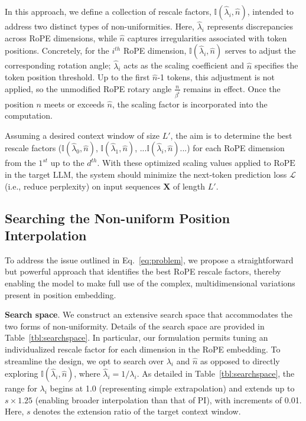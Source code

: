 In this approach, we define a collection of rescale factors, $\mathbb{I}(\hat{\lambda}_{i},\hat{n})$, intended to address two distinct types of non-uniformities. Here, $\hat{\lambda}_i$ represents discrepancies across RoPE dimensions, while $\hat{n}$ captures irregularities associated with token positions. Concretely, for the $i^{th}$ RoPE dimension, $\mathbb{I}(\hat{\lambda}_{i},\hat{n})$ serves to adjust the corresponding rotation angle; $\hat{\lambda}_{i}$ acts as the scaling coefficient and $\hat{n}$ specifies the token position threshold. Up to the first $\hat{n}$-1 tokens, this adjustment is not applied, so the unmodified RoPE rotary angle $\frac{n}{\beta^i}$ remains in effect. Once the position $n$ meets or exceeds $\hat{n}$, the scaling factor is incorporated into the computation.

Assuming a desired context window of size $L'$, the aim is to determine the best rescale factors ($\mathbb{I}(\hat{\lambda}_{0},\hat{n})$, $\mathbb{I}(\hat{\lambda}_{1},\hat{n})$, ...$\mathbb{I}(\hat{\lambda}_{i},\hat{n})$...) for each RoPE dimension from the $1^{st}$ up to the $d^{th}$. With these optimized scaling values applied to $\text{RoPE}$ in the target $\text{LLM}$, the system should minimize the next-token prediction loss $\mathcal{L}$ (i.e., reduce perplexity) on input sequences $\mathbf{X}$ of length $L'$.

\subsection{Searching the Non-uniform Position Interpolation}

To address the issue outlined in Eq.~\ref{eq:problem}, we propose a straightforward but powerful approach that identifies the best RoPE rescale factors, thereby enabling the model to make full use of the complex, multidimensional variations present in position embedding.

\textbf{Search space}. We construct an extensive search space that accommodates the two forms of non-uniformity. Details of the search space are provided in Table~\ref{tbl:searchspace}. In particular, our formulation permits tuning an individualized rescale factor for each dimension in the RoPE embedding. To streamline the design, we opt to search over $\lambda_i$ and $\hat{n}$ as opposed to directly exploring $\mathbb{I}(\hat{\lambda}_{i},\hat{n})$, where $\hat{\lambda}_{i}=1/\lambda_i$. As detailed in Table~\ref{tbl:searchspace}, the range for $\lambda_i$ begins at 1.0 (representing simple extrapolation) and extends up to $s\times1.25$ (enabling broader interpolation than that of PI), with increments of 0.01. Here, $s$ denotes the extension ratio of the target context window.

